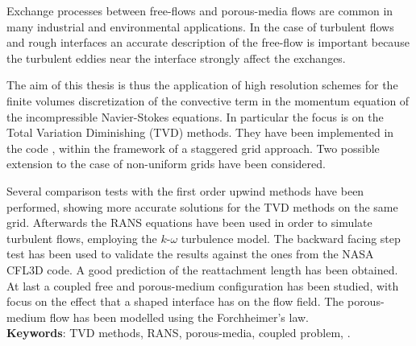 Exchange processes between free-flows and porous-media flows are common in many 
industrial and environmental applications. In the case of turbulent flows and 
rough interfaces an accurate description of the free-flow is important because 
the turbulent eddies near the interface strongly affect the exchanges.

The aim of this thesis is thus the application of high resolution schemes for 
the finite volumes discretization of the convective term in the momentum 
equation of the incompressible Navier-Stokes equations. In particular the focus 
is on the Total Variation Diminishing (TVD) methods. They have been implemented 
in the code \DUMUX, within the framework of a staggered grid approach. Two 
possible extension to the case of non-uniform grids have been considered.

Several comparison tests with the first order upwind methods have been 
performed, showing more accurate solutions for the TVD methods on the same grid.
Afterwards the RANS equations have been used in order to simulate turbulent 
flows, employing the $k\text{-}\omega$ turbulence model. The backward facing 
step test has been used to validate the results against the 
ones from the NASA CFL3D code. A good prediction of the reattachment length has 
been obtained. At last a coupled free and porous-medium configuration has been 
studied, with focus on the effect that a shaped interface has on the flow 
field. The porous-medium flow has been modelled using the Forchheimer's law.
\\[\baselineskip]
\textbf{Keywords}: TVD methods, RANS, porous-media, coupled problem, \DUMUX.